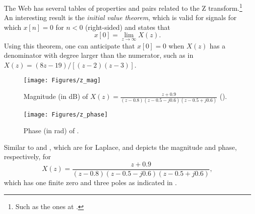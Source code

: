 The Web has several tables of properties and pairs related to the Z transform.\footnote{Such as the ones at .}
An interesting result is the \emph{initial value theorem}, which is valid for signals for which $x[n]=0$ for $n<0$ (right-sided) and states that
\[
x[0] = \lim_{z \rightarrow \infty} X(z).
\]
Using this theorem, one can anticipate that $x[0]=0$ when $X(z)$ has a denominator with degree larger than the numerator, such as in $X(z)=(8z-19)/[(z-2)(z-3)]$.





\begin{figure}[!htb]
        \centering
                \texttt{[image: Figures/z\_mag]}               
        \caption{Magnitude (in dB) of $X(z) = \frac{z+0.9}{(z-0.8)(z-0.5-j0.6)(z-0.5+j0.6)}$ ().\label{fig:z_mag}}
\end{figure}

\begin{figure}[!htb]
        \centering
                \texttt{[image: Figures/z\_phase]}             
        \caption{Phase (in rad) of .\label{fig:z_phase}}
\end{figure}

Similar to  and , which are for Laplace,  and  depicts the magnitude and phase, respectively, for
\begin{equation}
X(z) = \frac{z+0.9}{(z-0.8)(z-0.5-j0.6)(z-0.5+j0.6)},
\label{eq:example_z_transform}
\end{equation}
which has one finite zero and three poles as indicated in .

